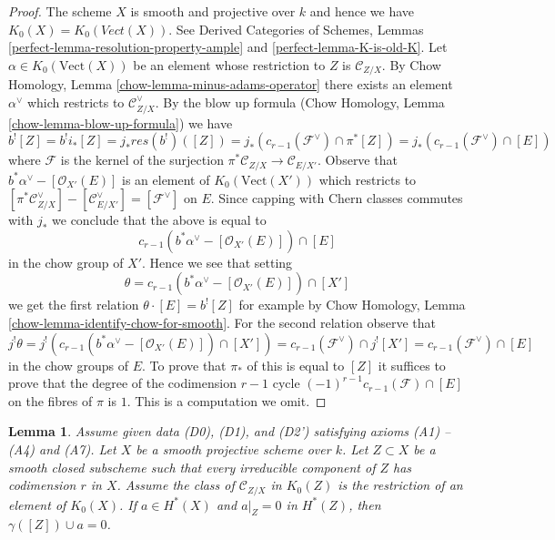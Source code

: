 \documentclass{stacks-project}
\theoremstyle{plain}
\newtheorem{lemma}[subsection]{Lemma}
\theoremstyle{definition}
\theoremstyle{remark}
\numberwithin{equation}{subsection}
\begin{document}
\begin{proof}
The scheme $X$ is smooth and projective over $k$ and hence we have
$K_0(X) = K_0(\textit{Vect}(X))$. See
Derived Categories of Schemes, Lemmas
\ref{perfect-lemma-resolution-property-ample} and
\ref{perfect-lemma-K-is-old-K}.
Let $\alpha \in K_0(\text{Vect}(X))$ be an element
whose restriction to $Z$ is $\mathcal{C}_{Z/X}$.
By Chow Homology, Lemma \ref{chow-lemma-minus-adams-operator}
there exists an element $\alpha^\vee$ which restricts to
$\mathcal{C}_{Z/X}^\vee$. By the blow up formula
(Chow Homology, Lemma \ref{chow-lemma-blow-up-formula})
we have
$$
b^![Z] = b^!i_*[Z] = j_* res(b^!)([Z]) =
j_*(c_{r - 1}(\mathcal{F}^\vee) \cap \pi^*[Z]) =
j_*(c_{r - 1}(\mathcal{F}^\vee) \cap [E])
$$
where $\mathcal{F}$ is the kernel of the surjection
$\pi^*\mathcal{C}_{Z/X} \to \mathcal{C}_{E/X'}$.
Observe that $b^*\alpha^\vee - [\mathcal{O}_{X'}(E)]$
is an element of $K_0(\text{Vect}(X'))$ which
restricts to $[\pi^*\mathcal{C}_{Z/X}^\vee] - [\mathcal{C}_{E/X'}^\vee] =
[\mathcal{F}^\vee]$ on $E$. Since capping with Chern classes
commutes with $j_*$ we conclude that the above is equal to
$$
c_{r - 1}(b^*\alpha^\vee - [\mathcal{O}_{X'}(E)]) \cap [E]
$$
in the chow group of $X'$. Hence we see that setting
$$
\theta = c_{r - 1}(b^*\alpha^\vee - [\mathcal{O}_{X'}(E)]) \cap [X']
$$
we get the first relation $\theta \cdot [E] = b^![Z]$
for example by Chow Homology, Lemma \ref{chow-lemma-identify-chow-for-smooth}.
For the second relation observe that
$$
j^!\theta = j^!(c_{r - 1}(b^*\alpha^\vee - [\mathcal{O}_{X'}(E)]) \cap [X'])
= c_{r - 1}(\mathcal{F}^\vee) \cap j^![X'] =
c_{r - 1}(\mathcal{F}^\vee) \cap [E]
$$
in the chow groups of $E$. To prove that $\pi_*$ of this is equal to $[Z]$ it
suffices to prove that the degree of the codimension $r - 1$ cycle
$(-1)^{r - 1}c_{r - 1}(\mathcal{F}) \cap [E]$ on the fibres of $\pi$ is $1$.
This is a computation we omit.
\end{proof}

\begin{lemma}
\label{lemma-A5-A6-imply}
Assume given data (D0), (D1), and (D2') satisfying axioms (A1) -- (A4)
and (A7). Let $X$ be a smooth projective scheme over $k$. Let $Z \subset X$
be a smooth closed subscheme such that every irreducible component of $Z$
has codimension $r$ in $X$. Assume the class of
$\mathcal{C}_{Z/X}$ in $K_0(Z)$ is the restriction of an element of $K_0(X)$.
If $a \in H^*(X)$ and $a|_Z = 0$ in $H^*(Z)$, then
$\gamma([Z]) \cup a = 0$.
\end{lemma}
\end{document}
